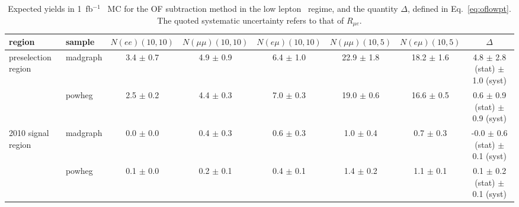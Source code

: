 \begin{table}[hbt]
\begin{center}
\footnotesize
\caption{\label{tab:mcoflowpt} Expected yields in 1~fb$^{-1}$ \ttbar\ MC for the OF subtraction method in the low lepton \pt\ regime,
and the quantity $\Delta$, defined in Eq.~\ref{eq:oflowpt}. The quoted systematic uncertainty refers to that of $R_{\mu e}$.
}
\begin{tabular}{llccccc|c}
\hline
region                  &     sample  & $N(ee)(10,10)$ & $N(\mu\mu)(10,10)$ & $N(e\mu)(10,10)$ & $N(\mu\mu)(10,5)$ & $N(e\mu)(10,5)$ & $\Delta$  \\ 
\hline

\hline

preselection region     &   madgraph  & 3.4 $\pm$ 0.7  & 4.9 $\pm$ 0.9      & 6.4 $\pm$ 1.0    & 22.9 $\pm$ 1.8    & 18.2 $\pm$ 1.6 &  4.8 $\pm$ 2.8 (stat) $\pm$ 1.0 (syst) \\  
                        &   powheg    & 2.5 $\pm$ 0.2  & 4.4 $\pm$ 0.3      & 7.0 $\pm$ 0.3    & 19.0 $\pm$ 0.6    & 16.6 $\pm$ 0.5 &  0.6 $\pm$ 0.9 (stat) $\pm$ 0.9 (syst) \\

\hline
2010 signal region      &   madgraph  & 0.0 $\pm$ 0.0  & 0.4 $\pm$ 0.3      & 0.6 $\pm$ 0.3    & 1.0 $\pm$ 0.4     & 0.7 $\pm$ 0.3  & -0.0 $\pm$ 0.6 (stat) $\pm$ 0.1 (syst) \\
                        &   powheg    & 0.1 $\pm$ 0.0  & 0.2 $\pm$ 0.1      & 0.4 $\pm$ 0.1    & 1.4 $\pm$ 0.2     & 1.1 $\pm$ 0.1  &  0.1 $\pm$ 0.2 (stat) $\pm$ 0.1 (syst) \\

\hline
\end{tabular}
\end{center}
\end{table}



